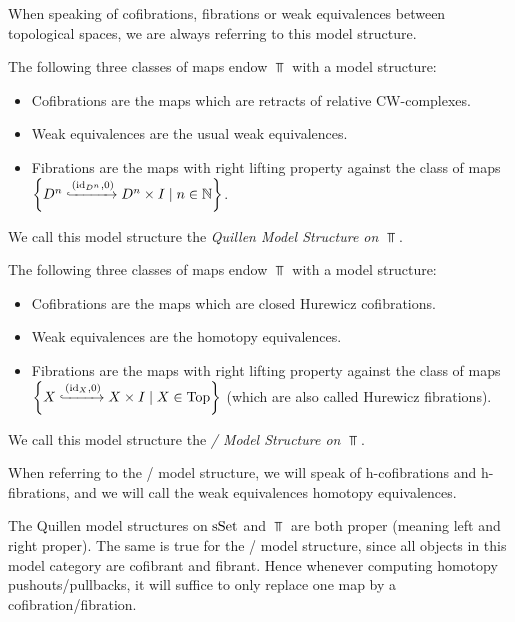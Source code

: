 When speaking of cofibrations, fibrations or weak equivalences between topological spaces, we are always referring to this model structure.
\begin{prop}
    The following three classes of maps endow $\Top$ with a model structure:
    \begin{itemize}
        \item Cofibrations are the maps which are retracts of relative CW-complexes. %
        \item Weak equivalences are the usual weak equivalences. %
        \item Fibrations are the maps with right lifting property against the class of maps $\left\lbrace D^n\xhookrightarrow{\left(\text{id}_{D^n},0\right)}D^n\times I\mid n\in\mathbb{N}\right\rbrace$.
    \end{itemize}
    We call this model structure the \emph{Quillen Model Structure on $\Top$}.
\end{prop}
\begin{prop}
    The following three classes of maps endow $\Top$ with a model structure:
    \begin{itemize}
        \item Cofibrations are the maps which are closed Hurewicz cofibrations. %
        \item Weak equivalences are the homotopy equivalences.
        \item Fibrations are the maps with right lifting property against the class of maps $\left\lbrace X\xhookrightarrow{\left(\text{id}_{X},0\right)}X\times I\mid X\in\operatorname{Top}\right\rbrace$ (which are also called Hurewicz fibrations).
    \end{itemize}
    We call this model structure the \emph{\Strom/ Model Structure on $\Top$}.
\end{prop}
When referring to the \Strom/ model structure, we will speak of h-cofibrations and h-fibrations, and we will call the weak equivalences homotopy equivalences.
\begin{remark}[Properness]
    The Quillen model structures on $\operatorname{sSet}$ and $\Top$ are both proper (meaning left and right proper).
    The same is true for the \Strom/ model structure, since all objects in this model category are cofibrant and fibrant.
    Hence whenever computing homotopy pushouts/pullbacks, it will suffice to only replace one map by a cofibration/fibration.
\end{remark}
